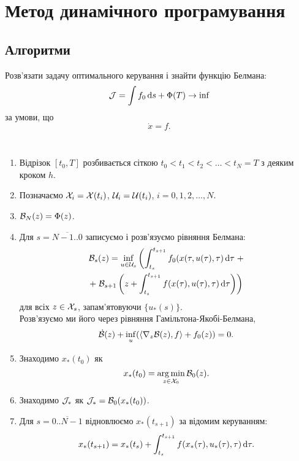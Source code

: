 \section{Метод динамічного програмування}

\subsection{Алгоритми}

\begin{problem*}
	Розв'язати задачу оптимального керування і знайти функцію Белмана: \[ \mathcal{J} = \int f_0 \mathop{}\!\mathrm{d} s + \Phi(T) \to \inf \] за умови, що \[ \dot x = f. \]
\end{problem*}

\begin{algorithm} \tt
	\begin{enumerate}
		\item Відрізок $[t_0, T]$ розбивається сіткою $t_0 < t_1 < t_2 < \ldots < t_N = T$ з деяким кроком $h$.
		\item Позначаємо $\mathcal{X}_i = \mathcal{X} (t_i)$, $\mathcal{U}_i = \mathcal{U} (t_i)$, $i = 0,1,2,\ldots,N$.
		\item $\mathcal{B}_N(z) = \Phi(z)$.
		\item Для $s=\overline{N-1..0}$ записуємо і розв'язуємо рівняння Белмана: \begin{multline*}\mathcal{B}_s(z) = \inf_{u\in \mathcal{U}_s} \left(\int_{t_s}^{t_{s+1}} f_0(x(\tau,u(\tau),\tau)\mathop{}\!\mathrm{d}\tau\right.+\\+\left.\mathcal{B}_{s+1}\left(z+\int_{t_s}^{t_{s+1}} f(x(\tau),u(\tau),\tau) \mathop{}\!\mathrm{d} \tau\right)\right) \end{multline*} для всіх $z \in \mathcal{X}_s$, запам'ятовуючи $\{u_*(s)\}$. \\

		Розв'язуємо ми його через рівняння Гамільтона-Якобі-Белмана, \[\dot {\mathcal{B}}(z) + \inf_u (\langle \nabla_z \mathcal{B}(z), f \rangle + f_0(z) ) = 0. \]

		\item Знаходимо $x_*(t_0)$ як \[ x_*(t_0) = \operatorname*{arg\,min}_{z\in \mathcal{X}_0} \mathcal{B}_0(z).\]
		\item Знаходимо $\mathcal{J}_*$ як $\mathcal{J}_* = \mathcal{B}_0(x_*(t_0))$.
		\item Для $s=\overline{0..N-1}$ відновлюємо $x_*(t_{s+1})$ за відомим керуванням: \[x_*(t_{s+1}) = x_*(t_s) + \int_{t_s}^{t_{s+1}} f(x_*(\tau),u_*(\tau),\tau) \mathop{}\!\mathrm{d} \tau.\] 
	\end{enumerate}
\end{algorithm}